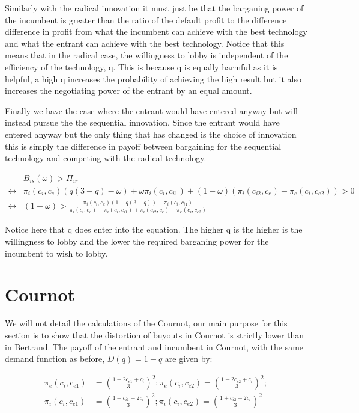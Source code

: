 \documentclass[11pt]{article}
\begin{document}
Similarly with the radical innovation it must just be that the barganing power of the incumbent is greater than the ratio of the default profit to the difference difference in profit from what the incumbent can achieve with the best technology and what the entrant can achieve with the best technology. Notice that this means that in the radical case, the willingness to lobby is independent of the efficiency of the technology, q. This is because q is equally harmful as it is helpful, a high q increases the probability of achieving the high result but it also increases the negotiating power of the entrant by an equal amount. 

Finally we have the case where the entrant would have entered anyway but will instead pursue the the sequential innovation. Since the entrant would have entered anyway but the only thing that has changed is the choice of innovation this is simply the difference in payoff between bargaining for the sequential technology and competing with the radical technology. 

\begin{align*}
&B_{is}(\omega)>\Pi_{ir} \\
\leftrightarrow &\pi_i(c_i,c_e)(q(3-q) -\omega) 
+\omega \pi_i(c_i,c_{i1}) 
 +(1-\omega)(\pi_i(c_{i2},c_e)-\pi_e(c_{i},c_{e2})) 
> 0 \\
\leftrightarrow &
(1-\omega)> \frac{\pi_i(c_i,c_e)(1-q(3-q))-\pi_i(c_i,c_{i1})}{\pi_i(c_i,c_e)-\pi_i(c_i,c_{i1})+\pi_i(c_{i2},c_e)-\pi_e(c_{i},c_{e2})}  
\end{align*}

Notice here that q does enter into the equation. The higher q is the higher is the willingness to lobby and the lower the required barganing power for the incumbent to wish to lobby. 

\section*{Cournot}

We will not detail the calculations of the Cournot, our main purpose for this section is to show that the distortion of buyouts in Cournot is strictly lower than in Bertrand. The payoff of the entrant and incumbent in Cournot, with the same demand function as before, $D(q)=1-q$ are given by:

\begin{align*}
\pi_{e}(c_i,c_{e1}) &= \left(\frac{1-2 c_{e1}+c_{i}}{3}  \right)^2;
\pi_{e}(c_i,c_{e2}) = \left(\frac{1-2 c_{e2}+c_{i}}{3}  \right)^2; \\
\pi_{i}(c_i,c_{e1}) &= \left(\frac{1+ c_{i1}-2c_{i}}{3}  \right)^2;
\pi_{i}(c_i,c_{e2}) = \left(\frac{1+ c_{i2}-2c_{i}}{3}  \right)^2 \\
\end{align*}
\end{document}
